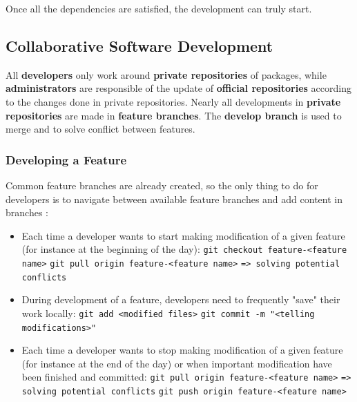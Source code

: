 \documentclass[12pt,a4paper]{article}
\begin{document}
Once all the dependencies are satisfied, the development can truly start.

\subsection{Collaborative Software Development}

All \textbf{developers} only work around \textbf{private repositories} of packages, while \textbf{administrators} are responsible of the update of \textbf{official repositories} according to the changes done in private repositories. Nearly all developments in \textbf{private repositories} are made in \textbf{feature branches}. The \textbf{develop branch} is used to merge and to solve conflict between features.

\subsubsection{Developing a Feature}

Common feature branches are already created, so the only thing to do for developers is to navigate between available feature branches and add content in branches :
\begin{itemize}
\item Each time a developer wants to start making modification of a given feature (for instance at the beginning of the day):
\linebreak \verb|git checkout feature-<feature name>|
\linebreak \verb|git pull origin feature-<feature name>|
\linebreak \verb|=> solving potential conflicts|
\item During development of a feature, developers need to frequently "save" their work locally:
\linebreak \verb|git add <modified files>|
\linebreak \verb|git commit -m "<telling modifications>"|
\item Each time a developer wants to stop making modification of a given feature (for instance at the end of the day) or when important modification have been finished and committed:
\linebreak \verb|git pull origin feature-<feature name>|
\linebreak \verb|=> solving potential conflicts|
\linebreak \verb|git push origin feature-<feature name>|
\end{itemize}
\end{document}
